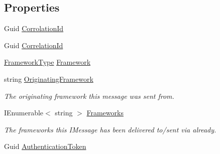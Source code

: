 \subsection*{Properties}
\begin{DoxyCompactItemize}
\item 
Guid \hyperlink{classCqrs_1_1Akka_1_1Tests_1_1Unit_1_1Commands_1_1ReplyToHelloWorldCommand_aed60fdcd1b0f47fd4a3eb8659fc505a1_aed60fdcd1b0f47fd4a3eb8659fc505a1}{Corrolation\+Id}
\item 
Guid \hyperlink{classCqrs_1_1Akka_1_1Tests_1_1Unit_1_1Commands_1_1ReplyToHelloWorldCommand_a773a29aa23cbb3c705b48587b866f54d_a773a29aa23cbb3c705b48587b866f54d}{Correlation\+Id}
\item 
\hyperlink{namespaceCqrs_1_1Messages_af06a7e6cd2609043d0f2f5f3419f81e3_af06a7e6cd2609043d0f2f5f3419f81e3}{Framework\+Type} \hyperlink{classCqrs_1_1Akka_1_1Tests_1_1Unit_1_1Commands_1_1ReplyToHelloWorldCommand_a311564a1db9eb1a55bdd3242a7e64c64_a311564a1db9eb1a55bdd3242a7e64c64}{Framework}
\item 
string \hyperlink{classCqrs_1_1Akka_1_1Tests_1_1Unit_1_1Commands_1_1ReplyToHelloWorldCommand_a8d3ad2d0c0c4d2654ea499468772eaeb_a8d3ad2d0c0c4d2654ea499468772eaeb}{Originating\+Framework}
\begin{DoxyCompactList}\small\item\em The originating framework this message was sent from. \end{DoxyCompactList}\item 
I\+Enumerable$<$ string $>$ \hyperlink{classCqrs_1_1Akka_1_1Tests_1_1Unit_1_1Commands_1_1ReplyToHelloWorldCommand_a894055f8b934a49d3e9d315f62cff8da_a894055f8b934a49d3e9d315f62cff8da}{Frameworks}
\begin{DoxyCompactList}\small\item\em The frameworks this I\+Message has been delivered to/sent via already. \end{DoxyCompactList}\item 
Guid \hyperlink{classCqrs_1_1Akka_1_1Tests_1_1Unit_1_1Commands_1_1ReplyToHelloWorldCommand_a556c313a49a66d1fd4f3df8dc15344ec_a556c313a49a66d1fd4f3df8dc15344ec}{Authentication\+Token}

\end{DoxyCompactItemize}
